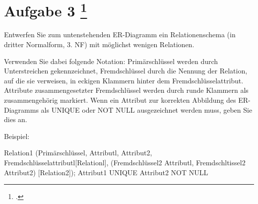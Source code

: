 \documentclass{lehramt-informatik-aufgabe}
\begin{document}
\section{Aufgabe 3
\footcite{66116:2021:03}}

Entwerfen Sie zum untenstehenden ER-Diagramm ein Relationenschema (in
dritter Normalform, 3. NF) mit möglichst wenigen Relationen.

Verwenden Sie dabei folgende Notation: Primärschlüssel werden durch
Unterstreichen gekennzeichnet, Fremdschlüssel durch die Nennung der
Relation, auf die sie verweisen, in eckigen Klammern hinter dem
Fremdschlüsselattribut. Attribute zusammengesetzter Fremdschlüssel
werden durch runde Klammern als zusammengehörig markiert. Wenn ein
Attribut zur korrekten Abbildung des ER-Diagramms als UNIQUE oder NOT
NULL ausgezeichnet werden muss, geben Sie dies an.

Beispiel:

Relation1 (Primärschlüssel, Attributl, Attribut2,
Fremdschlüsselattributl[Relationl],
(Fremdschlüssel2 Attributl, Fremdschltissel2 Attribut2) [Relation2]);
Attribut1 UNIQUE
Attribut2 NOT NULL

\end{document}
